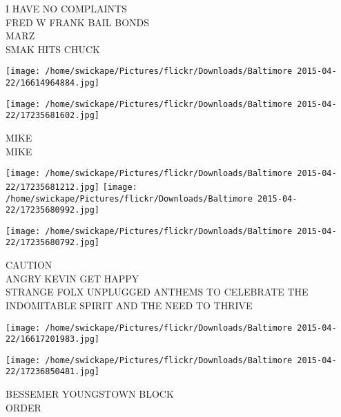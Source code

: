 \documentclass[10pt,letterpaper]{article}
\begin{document}
I HAVE NO COMPLAINTS\\
FRED W FRANK BAIL BONDS\\
MARZ\\
SMAK HITS CHUCK\\
\pagebreak

\texttt{[image: /home/swickape/Pictures/flickr/Downloads/Baltimore 2015-04-22/16614964884.jpg]}

\vspace{0.25in}
\texttt{[image: /home/swickape/Pictures/flickr/Downloads/Baltimore 2015-04-22/17235681602.jpg]}

MIKE\\
MIKE\\
\pagebreak

\texttt{[image: /home/swickape/Pictures/flickr/Downloads/Baltimore 2015-04-22/17235681212.jpg]}
\texttt{[image: /home/swickape/Pictures/flickr/Downloads/Baltimore 2015-04-22/17235680992.jpg]}

\texttt{[image: /home/swickape/Pictures/flickr/Downloads/Baltimore 2015-04-22/17235680792.jpg]}

CAUTION\\
ANGRY KEVIN GET HAPPY\\
STRANGE FOLX UNPLUGGED ANTHEMS TO CELEBRATE THE INDOMITABLE SPIRIT AND THE NEED TO THRIVE\\
\pagebreak

\texttt{[image: /home/swickape/Pictures/flickr/Downloads/Baltimore 2015-04-22/16617201983.jpg]}

\vspace{0.25in}
\texttt{[image: /home/swickape/Pictures/flickr/Downloads/Baltimore 2015-04-22/17236850481.jpg]}

BESSEMER YOUNGSTOWN BLOCK\\
ORDER\\
\pagebreak
\end{document}
